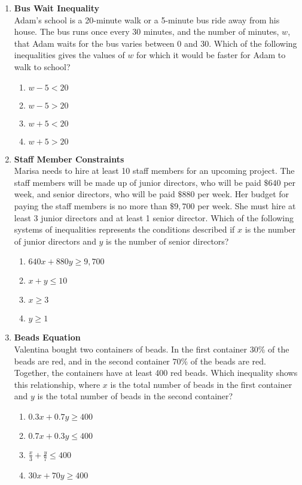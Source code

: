 \begin{enumerate}
\item \textbf{Bus Wait Inequality}\\
Adam's school is a 20-minute walk or a 5-minute bus ride away from his house. The bus runs once every 30 minutes, and the number of minutes, $w$, that Adam waits for the bus varies between 0 and 30. Which of the following inequalities gives the values of $w$ for which it would be faster for Adam to walk to school?
\begin{enumerate}[label=(\Alph*)]
  \item $w - 5 < 20$
  \item $w - 5 > 20$
  \item $w + 5 < 20$
  \item $w + 5 > 20$
\end{enumerate}
\begin{subanswer}
\end{subanswer}

\item \textbf{Staff Member Constraints}\\
Marisa needs to hire at least 10 staff members for an upcoming project. The staff members will be made up of junior directors, who will be paid $\$ 640$ per week, and senior directors, who will be paid $\$ 880$ per week. Her budget for paying the staff members is no more than $\$ 9,700$ per week. She must hire at least 3 junior directors and at least 1 senior director. Which of the following systems of inequalities represents the conditions described if $x$ is the number of junior directors and $y$ is the number of senior directors?
\begin{enumerate}[label=(\Alph*)]
  \item $640x + 880y \geq 9,700$
  \item $x + y \leq 10$
  \item $x \geq 3$
  \item $y \geq 1$
\end{enumerate}
\begin{subanswer}
\end{subanswer}

\item \textbf{Beads Equation}\\
Valentina bought two containers of beads. In the first container 30\% of the beads are red, and in the second container $70 \%$ of the beads are red. Together, the containers have at least 400 red beads. Which inequality shows this relationship, where $x$ is the total number of beads in the first container and $y$ is the total number of beads in the second container?
\begin{enumerate}[label=(\Alph*)]
  \item $0.3x + 0.7y \geq 400$
  \item $0.7x + 0.3y \leq 400$
  \item $\frac{x}{3} + \frac{y}{7} \leq 400$
  \item $30x + 70y \geq 400$
\end{enumerate}
\begin{subanswer}
\end{subanswer}


\end{enumerate}

